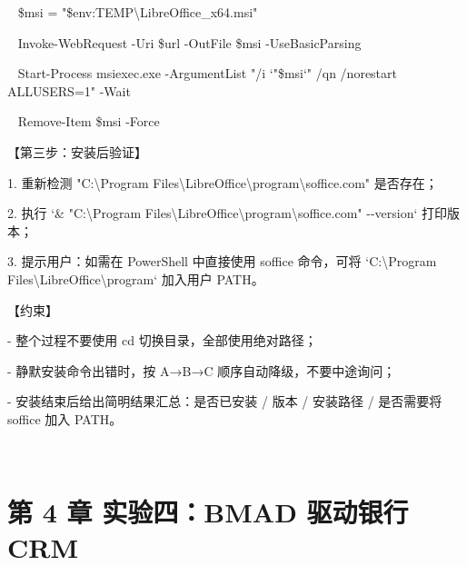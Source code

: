 \documentclass[
  american,
  chinese,
]{ctexart}
\begin{document}
\foreignlanguage{american}{{~ }\${msi} = "\${{env:TEMP}}{\textbackslash LibreOffice\_x64.msi}"}

\foreignlanguage{american}{{~ }Invoke-{WebRequest}
-Uri \${url} -{OutFile} \${msi} -{UseBasicParsing}}

\foreignlanguage{american}{{~ }Start-Process msiexec.exe -{ArgumentList} "/{i} `"\${msi}`" /qn /{norestart}
ALLUSERS=1" -Wait}

\foreignlanguage{american}{{~ }Remove-Item \${msi}
-Force}

{【第三步：安装后验证】}\foreignlanguage{american}{}

\foreignlanguage{american}{1. }{重新检测}\foreignlanguage{american}{ "C:\textbackslash Program
Files\textbackslash LibreOffice\textbackslash program\textbackslash soffice.com" }{是否存在；}\foreignlanguage{american}{}

\foreignlanguage{american}{2. }{执行}\foreignlanguage{american}{ `\& "C:\textbackslash Program
Files\textbackslash LibreOffice\textbackslash program\textbackslash soffice.com" -\/-version` }{打印版本；}\foreignlanguage{american}{}

\foreignlanguage{american}{3. }{提示用户：如需在}\foreignlanguage{american}{ PowerShell }{中直{接使用}}\foreignlanguage{american}{ {soffice}
}{命令，可将}\foreignlanguage{american}{ `C:\textbackslash Program
Files\textbackslash LibreOffice\textbackslash program` }{加入用户}\foreignlanguage{american}{ PATH}{。}\foreignlanguage{american}{}

{【约束】}\foreignlanguage{american}{}

\foreignlanguage{american}{- }{整个过程不要使用}\foreignlanguage{american}{ cd }{切换目录，全部使用绝对路径；}\foreignlanguage{american}{}

\foreignlanguage{american}{- }{静默安装命令出错时，按}\foreignlanguage{american}{ A}{→}\foreignlanguage{american}{B}{→}\foreignlanguage{american}{C }{顺序自动降级，不要中途询问；}\foreignlanguage{american}{}

\foreignlanguage{american}{- }{安装结束后给出简明结果汇总：是否已安装}\foreignlanguage{american}{ / }{版本}\foreignlanguage{american}{ / }{安装路径}\foreignlanguage{american}{ / }{是否需要将}\foreignlanguage{american}{ {soffice}
}{加入}\foreignlanguage{american}{ PATH}{。}\foreignlanguage{american}{}

\foreignlanguage{american}{}

~

\clearpage

\section{\texorpdfstring{{第}\foreignlanguage{american}{ 4 }{章}{ }{实验四：}\foreignlanguage{american}{BMAD }{驱动银行}\foreignlanguage{american}{ CRM}}{第 4 章 实验四：BMAD 驱动银行 CRM}}\label{ux7b2c-4-ux7ae0-ux5b9eux9a8cux56dbbmad-ux9a71ux52a8ux94f6ux884c-crm}
\end{document}
